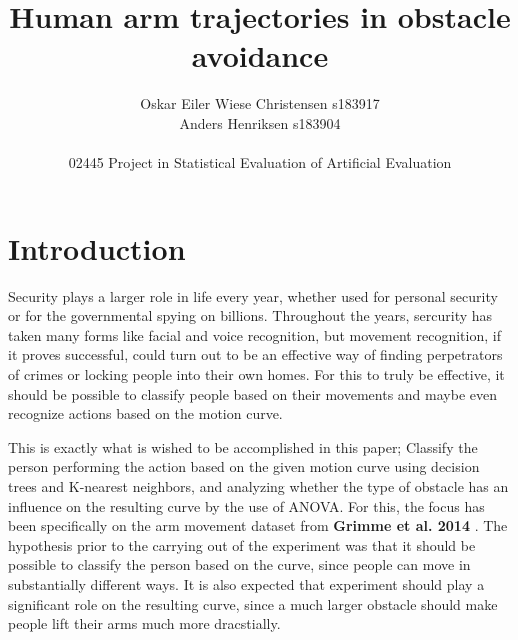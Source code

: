 \documentclass[11pt, fleqn, titlepage]{article}
\title{Human arm trajectories in obstacle avoidance}
\author{Oskar Eiler Wiese Christensen s183917 \\ Anders Henriksen s183904 \\ \\ 02445 Project in Statistical Evaluation of Artificial Evaluation}
\date{\today \vspace{2.5cm} \section*{\small Summary} 
\justify{\footnotesize  Security and access authorization plays a big role in modern society. Improvement of these systems could be accomplished by using movement curves to identify the person and give access only to those with authority. The purpose of this paper is to investigate if it is possible to identify people based on movement curves by using two machine learning models, K-nearest neighbors and a binary decision tree, as well as to test if experiment has a significant effect on curve. The results show that it is to some extent possible to predict person from curve and that KNN is most effective at this task. Meanwhile, experiment has a significant effect on curve. This implies that movement curves might be useful for classifying people if using more complicated machine learning models. Meanwhile, performing different actions lead to different curves, which has positive implications for the possibility of movement-based surveillance.}}
\begin{document}
\maketitle

\section{Introduction}
Security plays a larger role in life every year, whether used for personal security or for the governmental spying on billions. Throughout the years, sercurity has taken many forms like facial and voice recognition, but movement recognition, if it proves successful, could turn out to be an effective way of finding perpetrators of crimes or locking people into their own homes. For this to truly be effective, it should be possible to classify people based on their movements and maybe even recognize actions based on the motion curve.

This is exactly what is wished to be accomplished in this paper; Classify the person performing the action based on the given motion curve using decision trees and K-nearest neighbors, and analyzing whether the type of obstacle has an influence on the resulting curve by the use of ANOVA. For this, the focus has been specifically on the arm movement dataset from \textbf{Grimme et al. 2014} \cite{armdata}. The hypothesis prior to the carrying out of the experiment was that it should be possible to classify the person based on the curve, since people can move in substantially different ways. It is also expected that experiment should play a significant role on the resulting curve, since a much larger obstacle should make people lift their arms much more dracstially.
\end{document}
